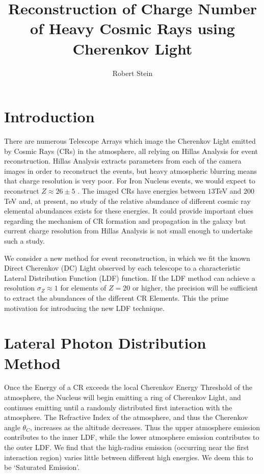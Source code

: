 \documentclass{article}
\begin{document}
\title{Reconstruction of Charge Number of Heavy Cosmic Rays using Cherenkov Light}
\author{Robert Stein}
\maketitle
\section{Introduction}
There are numerous Telescope Arrays which image the Cherenkov Light emitted by Cosmic Rays (CRs) in the atmosphere, all relying on Hillas Analysis for event reconstruction. Hillas Analysis extracts parameters from each of the camera images in order to reconstruct the events, but heavy atmospheric blurring means that charge resolution is very poor. For Iron Nucleus events, we would expect to reconstruct $Z \approx 26 \pm 5 $ \cite{hess07}. The imaged CRs have energies between $13 $TeV and $200 $TeV and, at present, no study of the relative abundance of different cosmic ray elemental abundances exists for these energies. It could provide important clues regarding the mechanism of CR formation and propagation in the galaxy but current charge resolution from Hillas Analysis is not small enough to undertake such a study.

We consider a new method for event reconstruction, in which we fit the known Direct Cherenkov (DC) Light observed by each telescope to a characteristic Lateral Distribution Function (LDF) function. If the LDF method can achieve a resolution $ \sigma_{Z} \approx 1 $ for elements of $Z = 20$ or higher, the precision will be sufficient to extract the abundances of the different CR Elements. This the prime motivation for introducing the new LDF technique.

\section{Lateral Photon Distribution Method}
Once the Energy of a CR exceeds the local Cherenkov Energy Threshold of the atmosphere, the Nucleus will begin emitting a ring of Cherenkov Light, and continues emitting until a randomly distributed first interaction with the atmosphere. The Refractive Index of the atmosphere, and thus the Cherenkov angle $\theta_{C}$, increases as the altitude decreases. Thus the upper atmosphere emission contributes to the inner LDF, while the lower atmosphere emission contributes to the outer LDF. We find that the high-radius emission (occurring near the first interaction region) varies little between different high energies. We deem this to be \textquoteleft Saturated Emission\textquoteright.
\end{document}
